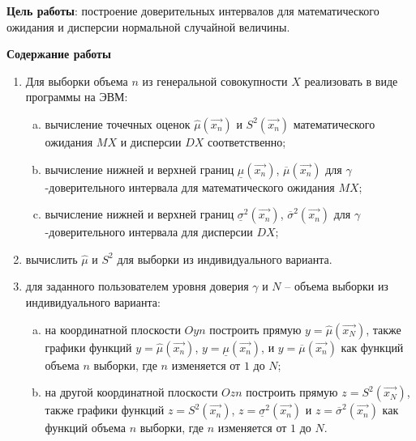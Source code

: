 \Introduction

\textbf{Цель работы}: построение доверительных интервалов для математического ожидания и дисперсии нормальной случайной величины.

\textbf{Содержание работы}

\begin{enumerate}[1.]
	\item Для выборки объема $n$ из генеральной совокупности $X$ реализовать в виде программы на ЭВМ:

	\begin{enumerate}[a)]
		\item вычисление точечных оценок $\hat{\mu}(\overrightarrow{x_n})$ и $S^2(\overrightarrow{x_n})$ математического ожидания $MX$ и дисперсии $DX$ соответственно;
		
		\item вычисление нижней и верхней границ $\underline{\mu}(\overrightarrow{x_n})$, $\overline{\mu}(\overrightarrow{x_n})$ для $\gamma$-доверительного интервала для математического ожидания $MX$;
		
		\item вычисление нижней и верхней границ $\underline{\sigma}^2(\overrightarrow{x_n})$, $\overline{\sigma}^2(\overrightarrow{x_n})$ для $\gamma$-доверительного интервала для дисперсии $DX$;
	\end{enumerate}

	\item вычислить $\hat{\mu}$ и $S^2$ для выборки из индивидуального варианта.
	
	\item для заданного пользователем уровня доверия $\gamma$ и $N$ -- объема выборки из индивидуального варианта:
	
	\begin{enumerate}[a)]
		\item на координатной плоскости $Oyn$ построить прямую $y = \hat{\mu}(\overrightarrow{x_N})$, также графики функций $y = \hat{\mu}(\overrightarrow{x_n})$, $y = \underline{\mu}(\overrightarrow{x_n})$, и $y = \overline{\mu}(\overrightarrow{x_n})$ как функций объема $n$ выборки, где $n$ изменяется от $1$ до $N$;
		
		\item на другой координатной плоскости $Ozn$ построить прямую $z = S^2(\overrightarrow{x_N})$, также графики функций $z = S^2(\overrightarrow{x_n})$, $z = \underline{\sigma}^2(\overrightarrow{x_n})$ и $z = \overline{\sigma}^2(\overrightarrow{x_n})$ как функций объема $n$ выборки, где $n$ изменяется от $1$ до $N$. 
	\end{enumerate}
\end{enumerate}

